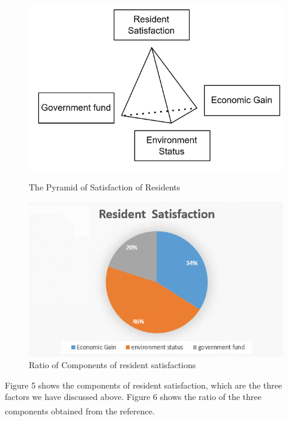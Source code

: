 \documentclass[UTF8]{mcmthesis}
\begin{document}
        \begin{figure}[htbp]
            \centering
            \begin{minipage}{0.45\textwidth}
                \centering
                \includegraphics[width=\textwidth]{pyramid.png}
                \caption{The Pyramid of Satisfaction of Residents}
            \end{minipage}\hfill
            \begin{minipage}{0.45\textwidth}
                \centering
                \includegraphics[width=\textwidth]{circle.png}
                \caption{Ratio of Components of resident satisfactions}
            \end{minipage}
        \end{figure}

        Figure 5 shows the components of resident satisfaction, which are the three factors we have discussed above. Figure 6 shows the ratio of the three components obtained from the reference\textsuperscript{\cite{Cottrell}}.
\end{document}

